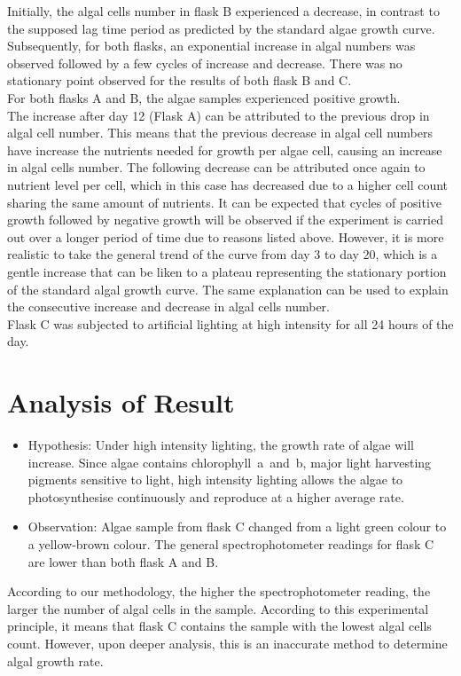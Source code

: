 \documentclass[12pt,a4paper]{IEEEtran}
\begin{document}
    Initially, the algal cells number in flask B experienced a decrease, in contrast to the supposed lag time period as predicted by the standard algae growth curve. Subsequently, for both flasks, an exponential
    increase in algal numbers was observed followed by a few cycles of increase and decrease. There was no stationary point observed for the results of both flask B and C. \\
    
    For both flasks A and B, the algae samples experienced positive growth. \\
    
    The increase after day 12 (Flask A) can be attributed to the previous drop in algal cell number. This means that the previous decrease in algal cell numbers have increase the nutrients needed for growth per
    algae cell, causing an increase in algal cells number. The following decrease can be attributed once again to nutrient level per cell, which in this case has decreased due to a higher cell count sharing the same amount of nutrients. It can be expected that cycles of positive growth followed by negative growth will be observed if the experiment is carried out over a longer period of time due to reasons listed above. However, it is more realistic to take the general trend of the curve from day 3 to day 20, which is a gentle increase that can be liken to a plateau representing the stationary portion of the standard algal growth curve. The same explanation can be used to explain the consecutive increase and decrease in algal cells number. \\
    
    Flask C was subjected to artificial lighting at high intensity for all 24 hours of the day.
    
    \section{Analysis of Result}
    \begin{itemize}
    	\item Hypothesis: Under high intensity lighting, the growth rate of algae will increase. Since algae contains chlorophyll~a~and~b, major light harvesting pigments sensitive to light, high intensity lighting allows the algae to photosynthesise continuously and reproduce at a higher average rate. \\
    	\item Observation: Algae sample from flask C changed from a light green colour to a yellow-brown colour. The general spectrophotometer readings for flask C are lower than both flask A and B. \\
    \end{itemize}
    According to our methodology, the higher the spectrophotometer reading, the larger the number of algal cells in the sample. According to this experimental principle, it means that flask C contains the sample with the lowest algal cells count. However, upon deeper analysis, this is an inaccurate method to determine algal growth rate. \\
    
\end{document}
